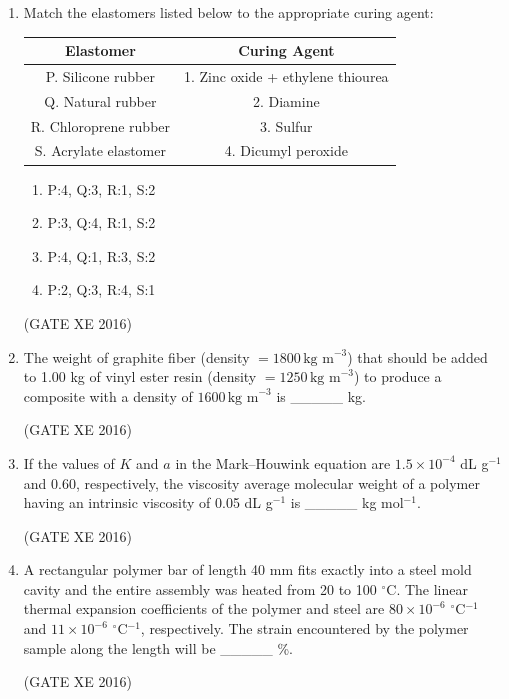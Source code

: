 \documentclass[12pt]{article}
\begin{document}
\begin{enumerate}
(GATE XE 2016)

\item Match the elastomers listed below to the appropriate curing agent:

\begin{table}[H]
\centering
\begin{tabular}{|c|c|}
\hline
Elastomer & Curing Agent \\
\hline
P. Silicone rubber & 1. Zinc oxide + ethylene thiourea \\
Q. Natural rubber & 2. Diamine \\
R. Chloroprene rubber & 3. Sulfur \\
S. Acrylate elastomer & 4. Dicumyl peroxide \\
\hline
\end{tabular}
\end{table}

\begin{multicols}{2}
\begin{enumerate}
\item P:4, Q:3, R:1, S:2
\item P:3, Q:4, R:1, S:2
\item P:4, Q:1, R:3, S:2
\item P:2, Q:3, R:4, S:1
\end{enumerate}
\end{multicols}
(GATE XE 2016)

\item The weight of graphite fiber (density $=1800 \,\text{kg m}^{-3}$) that should be added to 1.00 kg of vinyl ester resin (density $=1250 \,\text{kg m}^{-3}$) to produce a composite with a density of $1600 \,\text{kg m}^{-3}$ is \_\_\_\_\_ kg. 

(GATE XE 2016)

\item If the values of $K$ and $a$ in the Mark–Houwink equation are $1.5 \times 10^{-4}$ dL g$^{-1}$ and 0.60, respectively, the viscosity average molecular weight of a polymer having an intrinsic viscosity of 0.05 dL g$^{-1}$ is \_\_\_\_\_ kg mol$^{-1}$. 

(GATE XE 2016)

\item A rectangular polymer bar of length 40 mm fits exactly into a steel mold cavity and the entire assembly was heated from 20 to 100 $^\circ$C. The linear thermal expansion coefficients of the polymer and steel are $80 \times 10^{-6}$ $^\circ$C$^{-1}$ and $11 \times 10^{-6}$ $^\circ$C$^{-1}$, respectively. The strain encountered by the polymer sample along the length will be \_\_\_\_\_ \%. 

(GATE XE 2016)

\end{enumerate}
\end{document}

